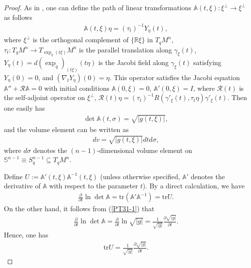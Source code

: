 \documentclass[12pt]{article}
\begin{document}
\begin{proof}
As in \cite[p. 703]{FMI}, one can define the path of linear
transformations
$\mathbb{A}(t,\xi):\xi^{\bot}\rightarrow{\xi^{\bot}}$ as follows
 \begin{eqnarray} \label{PLT}
\mathbb{A}(t,\xi)\eta=(\tau_{t})^{-1}Y_{\eta}(t),
 \end{eqnarray}
where
  $\xi^{\bot}$ is the orthogonal complement of
$\{\mathbb{R}\xi\}$ in $T_{q}M^{n}$,
$\tau_{t}:T_{q}M^{n}\rightarrow{T_{\exp_{q}(t\xi)}M^{n}}$ is the
parallel translation along $\gamma_{\xi}(t)$,
$Y_{\eta}(t)=d(\exp_q)_{(t\xi)}(t\eta)$ is the Jacobi field along
$\gamma_{\xi}(t)$ satisfying $Y_{\eta}(0)=0$, and
$(\nabla_{t}Y_{\eta})(0)=\eta$. This operator satisfies the Jacobi
equation
 $\mathbb{A}''+\mathcal{R}\mathbb{A}=0$ with initial conditions
 $\mathbb{A}(0,\xi)=0$, $\mathbb{A}'(0,\xi)=I$, where
$\mathcal{R}(t)$ is the self-adjoint operator on $\xi^{\bot}$, $
\mathcal{R}(t)\eta=(\tau_{t})^{-1}R(\gamma'_{\xi}(t),\tau_{t}\eta)
\gamma'_{\xi}(t)$. Then one easily has
\begin{eqnarray} \label{PT31-1}
\det \mathbb{A}(t,\sigma) = \sqrt{|g(t,\xi)|},
\end{eqnarray}
and the volume element can be written as
\begin{eqnarray*}
dv = \sqrt{|g(t,\xi)|}dtd\sigma,
\end{eqnarray*}
where $d\sigma$ denotes the $(n-1)$-dimensional volume element on
$\mathbb{S}^{n-1}\equiv S^{n-1}_{q}\subseteq T_{q}M^{n}$.

Define $U:= \mathbb{A}'(t,\xi)\mathbb{A}^{-1}(t,\xi)$ (unless
otherwise specified, $\mathbb{A}'$ denotes the derivative of
$\mathbb{A}$ with respect to the parameter $t$). By a direct
calculation, we have
\begin{eqnarray*}
\frac{\partial}{\partial t} \ln \det \mathbb{A}=\mathrm{tr}
(\mathbb{A}'\mathbb{A}^{-1})=\mathrm{tr} U.
\end{eqnarray*}
On the other hand, it follows from (\ref{PT31-1}) that
\begin{eqnarray*}
\frac{\partial}{\partial t}\ln \det
\mathbb{A}=\frac{\partial}{\partial
t}\ln\sqrt{|g|}=\frac{1}{\sqrt{|g|}}\frac{\partial
\sqrt{|g|}}{\partial t}.
\end{eqnarray*}
Hence, one has
\begin{eqnarray*}
\mathrm{tr} U=\frac{1}{\sqrt{|g|}}\frac{\partial
\sqrt{|g|}}{\partial t}.
\end{eqnarray*}


\end{proof}
\end{document}

